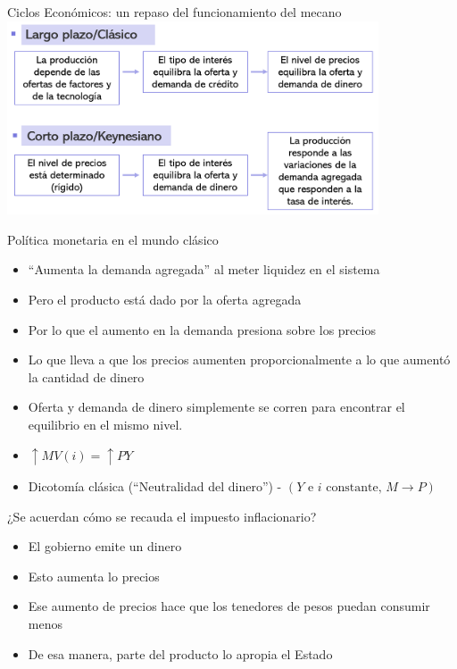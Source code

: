 \documentclass{beamer}
\begin{document}
\begin{frame}{Ciclos Económicos: un repaso del funcionamiento del mecano}
\centering\includegraphics[width=11cm]{Figures/P18.png}\
\end{frame}

\begin{frame}{Política monetaria en el mundo clásico}

    \begin{itemize}
        \item “Aumenta la demanda agregada” al meter liquidez en el sistema 
       \item Pero el producto está dado por la oferta agregada
        \item Por lo que el aumento en la demanda presiona sobre los precios
        \item Lo que lleva a que los precios aumenten proporcionalmente a lo que aumentó la cantidad de dinero
       \item Oferta y demanda de dinero simplemente se corren para encontrar el equilibrio en el mismo nivel.
        \item $\uparrow M V(i)=\uparrow P Y$ 
       \item Dicotomía clásica (“Neutralidad del dinero”) - $(Y \text { e } i \text { constante, } M \rightarrow P)$
    \end{itemize}
\end{frame}

\begin{frame}{¿Se acuerdan cómo se recauda el impuesto inflacionario?}
    \begin{itemize}
        \item El gobierno emite un dinero
        \item Esto aumenta lo precios
        \item Ese aumento de precios hace que los tenedores de pesos puedan consumir menos
        \item De esa manera, parte del producto lo apropia el Estado
    \end{itemize}
\end{frame}
\end{document}

